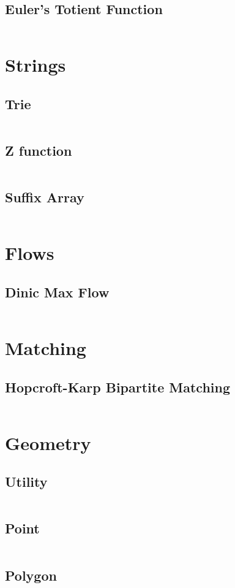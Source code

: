   \subsection{Euler's Totient Function}
    \inputminted{cpp}{library/maths/euler_phi.hpp}

\section{Strings}
  \subsection{Trie}
    \inputminted{cpp}{library/strings/trie.hpp}
  \subsection{Z function}
    \inputminted{cpp}{library/strings/z_function.hpp}
  \subsection{Suffix Array}
    \inputminted{cpp}{library/strings/suffix_array.hpp}

\section{Flows}
  \subsection{Dinic Max Flow}
    \inputminted{cpp}{library/flows/dinic.hpp}

\section{Matching}
  \subsection{Hopcroft-Karp Bipartite Matching}
    \inputminted{cpp}{library/matching/hopcroft_karp.hpp}

\section{Geometry}
  \subsection{Utility}
    \inputminted{cpp}{library/geo/geoutil.hpp}
  \subsection{Point}
    \inputminted{cpp}{library/geo/point.hpp}
  \subsection{Polygon}
    \inputminted{cpp}{library/geo/polygon.hpp}